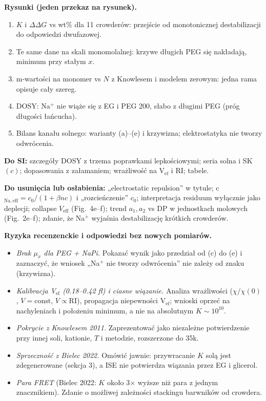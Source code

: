 \documentclass[10pt,a4paper]{article}
\newcommand{\dG}{\Delta\Delta G}
\begin{document}
\textbf{Rysunki (jeden przekaz na rysunek).}
\begin{enumerate}\itemsep1pt
\item $K$ i $\dG$ vs wt\% dla 11 crowderów: przejście od monotonicznej destabilizacji do odpowiedzi dwufazowej.
\item Te same dane na skali monomolalnej: krzywe długich PEG się nakładają, minimum przy stałym $x$.
\item m-wartości na monomer vs $N$ z Knowlesem i modelem zerowym: jedna rama opisuje cały szereg.
\item DOSY: Na$^+$ nie wiąże się z EG i PEG 200, słabo z długimi PEG (próg długości łańcucha).
\item Bilans kanału solnego: warianty (a)--(e) i krzywizna; elektrostatyka nie tworzy odwrócenia.
\end{enumerate}
\textbf{Do SI:} szczegóły DOSY z trzema poprawkami lepkościowymi; seria solna i SK$(c)$; dopasowania z załamaniem; wrażliwość na V$_\mathrm{ef}$ i RI; tabele.

\textbf{Do usunięcia lub osłabienia:} „electrostatic repulsion” w tytule; c$_\mathrm{Na,eff}=c_0/(1+\beta n c)$ i „rozcieńczenie” $c_0$; interpretacja residuum wyłącznie jako deplecji; collapse $V_\mathrm{eff}$ (Fig.~4e--f); trend $a_1,a_2$ vs DP w jednostkach molowych (Fig.~2e--f); zdanie, że Na$^+$ wyjaśnia destabilizację krótkich crowderów.

\textbf{Ryzyka recenzenckie i odpowiedzi bez nowych pomiarów.}
\begin{itemize}\itemsep1pt
\item \emph{Brak $\mu_x$ dla PEG + NaPi.} Pokazać wynik jako przedział od (c) do (e) i zaznaczyć, że wniosek „Na$^+$ nie tworzy odwrócenia” nie zależy od znaku (krzywizna).
\item \emph{Kalibracja V$_\mathrm{ef}$ (0.18--0.42 fl) i ciasne wiązanie.} Analiza wrażliwości ($\chi/\chi(0)$, $V=\mathrm{const}$, $V\propto\mathrm{RI}$), propagacja niepewności V$_\mathrm{ef}$; wnioski oprzeć na nachyleniach i położeniu minimum, a nie na absolutnym $K\sim10^{10}$.
\item \emph{Pokrycie z Knowlesem 2011.} Zaprezentować jako niezależne potwierdzenie przy innej soli, kationie, $T$ i metodzie, rozszerzone do 35k.
\item \emph{Sprzeczność z Bielec 2022.} Omówić jawnie: przywracanie $K$ solą jest zdegenerowane (sekcja 3), a ISE nie potwierdza wiązania przez EG i glicerol.
\item \emph{Para FRET} (Bielec 2022: $K$ około 3$\times$ wyższe niż para z jednym znacznikiem). Zdanie o możliwej zależności stackingu barwników od crowdera.
\end{itemize}
\end{document}

